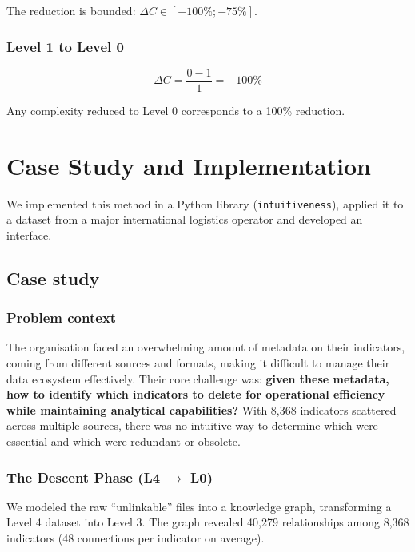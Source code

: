 \documentclass[12pt,a4paper]{article}
\begin{document}
The reduction is bounded: $\Delta C \in [-100\%; -75\%]$.

\subsubsection{Level 1 to Level 0}
\begin{equation}
\Delta C = \frac{0 - 1}{1} = -100\%
\end{equation}

Any complexity reduced to Level 0 corresponds to a 100\% reduction.

\section{Case Study and Implementation}
\label{sec:case-study}


We implemented this method in a Python library (\texttt{intuitiveness}), applied it to a dataset from a major international logistics operator and developed an interface. 

\subsection{Case study}

\subsubsection{Problem context}
The organisation faced an overwhelming amount of metadata on their indicators, coming from different sources and formats, making it difficult to manage their data ecosystem effectively. Their core challenge was: \textbf{given these metadata, how to identify which indicators to delete for operational efficiency while maintaining analytical capabilities?} With 8,368 indicators scattered across multiple sources, there was no intuitive way to determine which were essential and which were redundant or obsolete.

\subsubsection{The Descent Phase (L4 $\to$ L0)}

\vspace{1em}

We modeled the raw ``unlinkable'' files into a knowledge graph, transforming a Level 4 dataset into Level 3. The graph revealed 40,279 relationships among 8,368 indicators (48 connections per indicator on average).
\end{document}
